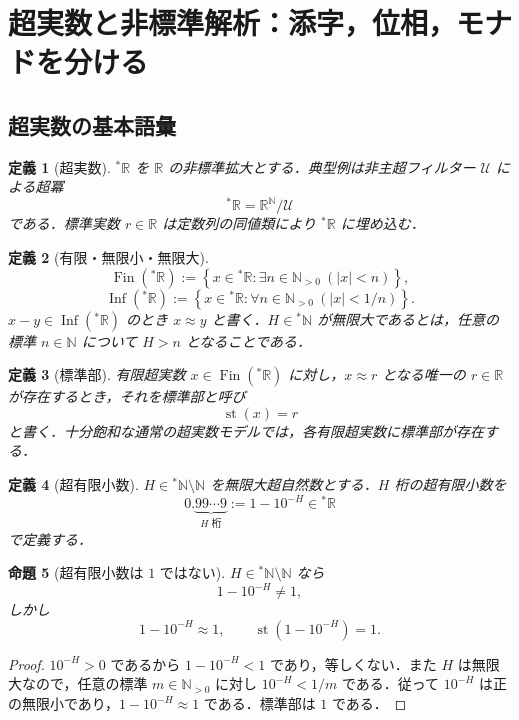 \documentclass[a4paper,11pt]{ltjsarticle}
\theoremstyle{jpdef}
\newtheorem{definition}{定義}[section]
\theoremstyle{jpthm}
\newtheorem{proposition}[definition]{命題}
\newcommand{\N}{\mathbb{N}}
\newcommand{\R}{\mathbb{R}}
\newcommand{\st}{\operatorname{st}}
\newcommand{\Fin}{\operatorname{Fin}}
\newcommand{\Inf}{\operatorname{Inf}}
\newcommand{\Ns}{\N_{>0}}
\newcommand{\set}[1]{\left\{#1\right\}}
\newcommand{\ulim}[1]{{}^{\ast}#1}
\begin{document}
\section{超実数と非標準解析：添字，位相，モナドを分ける}

\subsection{超実数の基本語彙}

\begin{definition}[超実数]
\(\ulim\R\) を \(\R\) の非標準拡大とする．典型例は非主超フィルター \(\mathcal U\) による超冪
\[
  \ulim\R=\R^{\N}/\mathcal U
\]
である．標準実数 \(r\in\R\) は定数列の同値類により \(\ulim\R\) に埋め込む．
\end{definition}

\begin{definition}[有限・無限小・無限大]
\[
  \Fin(\ulim\R):=\set{x\in\ulim\R:\exists n\in\Ns\ (|x|<n)},
\]
\[
  \Inf(\ulim\R):=\set{x\in\ulim\R:\forall n\in\Ns\ (|x|<1/n)}.
\]
\(x-y\in\Inf(\ulim\R)\) のとき \(x\approx y\) と書く．\(H\in\ulim\N\) が無限大であるとは，任意の標準 \(n\in\N\) について \(H>n\) となることである．
\end{definition}

\begin{definition}[標準部]
有限超実数 \(x\in\Fin(\ulim\R)\) に対し，\(x\approx r\) となる唯一の \(r\in\R\) が存在するとき，それを標準部と呼び
\[
  \st(x)=r
\]
と書く．十分飽和な通常の超実数モデルでは，各有限超実数に標準部が存在する．
\end{definition}

\begin{definition}[超有限小数]
\(H\in\ulim\N\setminus\N\) を無限大超自然数とする．\(H\) 桁の超有限小数を
\[
  0.\underbrace{99\cdots9}_{H\text{ 桁}}
  :=1-10^{-H}\in\ulim\R
\]
で定義する．
\end{definition}

\begin{proposition}[超有限小数は \(1\) ではない]
\(H\in\ulim\N\setminus\N\) なら
\[
  1-10^{-H}\ne1,
\]
しかし
\[
  1-10^{-H}\approx1,
  \qquad
  \st(1-10^{-H})=1.
\]
\end{proposition}

\begin{proof}
\(10^{-H}>0\) であるから \(1-10^{-H}<1\) であり，等しくない．また \(H\) は無限大なので，任意の標準 \(m\in\Ns\) に対し \(10^{-H}<1/m\) である．従って \(10^{-H}\) は正の無限小であり，\(1-10^{-H}\approx1\) である．標準部は \(1\) である．
\end{proof}
\end{document}
